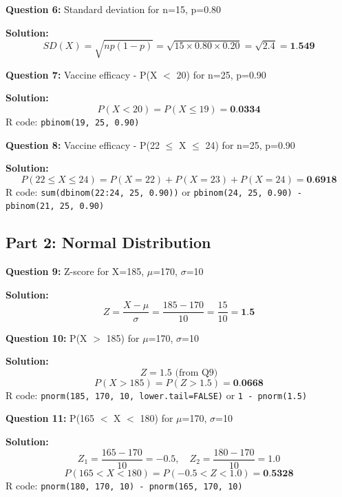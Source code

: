 \documentclass[11pt]{article}
\begin{document}
\textbf{Question 6:} Standard deviation for n=15, p=0.80

\textcolor{correctgreen}{\textbf{Solution:}}
$$SD(X) = \sqrt{np(1-p)} = \sqrt{15 \times 0.80 \times 0.20} = \sqrt{2.4} = \textbf{1.549}$$

\vspace{0.5cm}

\textbf{Question 7:} Vaccine efficacy - P(X $<$ 20) for n=25, p=0.90

\textcolor{correctgreen}{\textbf{Solution:}}
$$P(X < 20) = P(X \leq 19) = \textbf{0.0334}$$
R code: \texttt{pbinom(19, 25, 0.90)}

\vspace{0.5cm}

\textbf{Question 8:} Vaccine efficacy - P(22 $\leq$ X $\leq$ 24) for n=25, p=0.90

\textcolor{correctgreen}{\textbf{Solution:}}
$$P(22 \leq X \leq 24) = P(X=22) + P(X=23) + P(X=24) = \textbf{0.6918}$$
R code: \texttt{sum(dbinom(22:24, 25, 0.90))} or \texttt{pbinom(24, 25, 0.90) - pbinom(21, 25, 0.90)}

\subsection*{Part 2: Normal Distribution}

\textbf{Question 9:} Z-score for X=185, $\mu$=170, $\sigma$=10

\textcolor{correctgreen}{\textbf{Solution:}}
$$Z = \frac{X - \mu}{\sigma} = \frac{185 - 170}{10} = \frac{15}{10} = \textbf{1.5}$$

\vspace{0.5cm}

\textbf{Question 10:} P(X $>$ 185) for $\mu$=170, $\sigma$=10

\textcolor{correctgreen}{\textbf{Solution:}}
$$Z = 1.5 \text{ (from Q9)}$$
$$P(X > 185) = P(Z > 1.5) = \textbf{0.0668}$$
R code: \texttt{pnorm(185, 170, 10, lower.tail=FALSE)} or \texttt{1 - pnorm(1.5)}

\vspace{0.5cm}

\textbf{Question 11:} P(165 $<$ X $<$ 180) for $\mu$=170, $\sigma$=10

\textcolor{correctgreen}{\textbf{Solution:}}
$$Z_1 = \frac{165-170}{10} = -0.5, \quad Z_2 = \frac{180-170}{10} = 1.0$$
$$P(165 < X < 180) = P(-0.5 < Z < 1.0) = \textbf{0.5328}$$
R code: \texttt{pnorm(180, 170, 10) - pnorm(165, 170, 10)}

\vspace{0.5cm}
\end{document}
